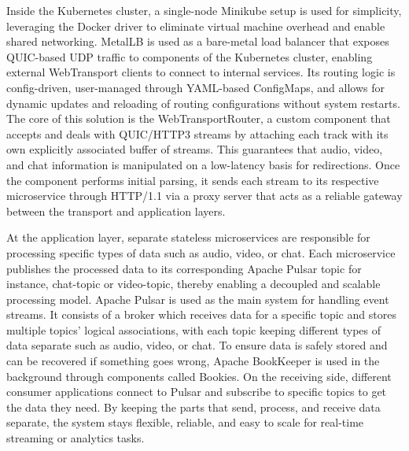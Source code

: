 Inside the Kubernetes cluster, a single-node Minikube setup is used for simplicity, leveraging the Docker driver to eliminate virtual machine overhead and enable shared networking. MetalLB is used as a bare-metal load balancer that exposes QUIC-based UDP traffic to components of the Kubernetes cluster, enabling external WebTransport clients to connect to internal services. Its routing logic is config-driven, user-managed through YAML-based ConfigMaps, and allows for dynamic updates and reloading of routing configurations without system restarts. The core of this solution is the WebTransportRouter, a custom component that accepts and deals with QUIC/HTTP3 streams by attaching each track with its own explicitly associated buffer of streams. This guarantees that audio, video, and chat information is manipulated on a low-latency basis for redirections. Once the component performs initial parsing, it sends each stream to its respective microservice through HTTP/1.1 via a proxy server that acts as a reliable gateway between the transport and application layers.

At the application layer, separate stateless microservices are responsible for processing specific types of data such as audio, video, or chat. Each microservice publishes the processed data to its corresponding Apache Pulsar topic for instance, chat-topic or video-topic, thereby enabling a decoupled and scalable processing model. Apache Pulsar is used as the main system for handling event streams. It consists of a broker which receives data for a specific topic and stores multiple topics' logical associations, with each topic keeping different types of data separate such as audio, video, or chat. To ensure data is safely stored and can be recovered if something goes wrong, Apache BookKeeper is used in the background through components called Bookies. On the receiving side, different consumer applications connect to Pulsar and subscribe to specific topics to get the data they need. By keeping the parts that send, process, and receive data separate, the system stays flexible, reliable, and easy to scale for real-time streaming or analytics tasks.
